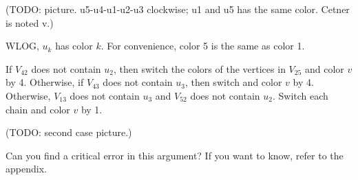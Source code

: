         (TODO: picture. u5-u4-u1-u2-u3 clockwise; u1 and u5 has the same color. Cetner is noted v.)
        
        WLOG, $u_k$ has color $k$. For convenience, color 5 is the same as color 1.
        
        If $V_{42}$ does not contain $u_2$, then switch the colors of the vertices in $V_{25}$ and color $v$ by 4. Otherwise, if $V_{43}$ does not contain $u_3$, then switch and color $v$ by 4. Otherwise, $V_{13}$ does not contain $u_3$ and $V_{52}$ does not contain $u_2$. Switch each chain and color $v$ by 1.
        
        (TODO: second case picture.)
        
        Can you find a critical error in this argument? If you want to know, refer to the appendix.
    
